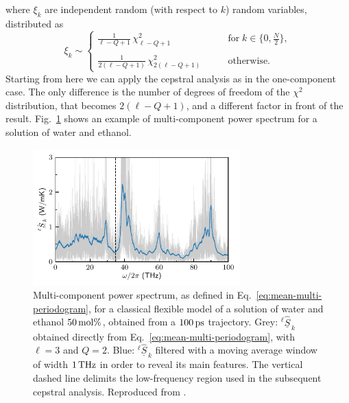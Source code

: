 where $\xi_k$ are independent random (with respect to $k$) random variables, distributed as
\begin{equation}
  \xi_k \sim
  \begin{cases}
    \frac{1}{\ell-Q+1} \,\chi^2_{\ell-Q+1}  \qquad & \mathrm{for} \; k \in \{0 , \frac{N}{2}\}, \\
 \\
 \frac{1}{2(\ell-Q+1)} \, \chi^2_{2(\ell-Q+1)} \qquad & \mathrm{otherwise}.
\end{cases}
\end{equation}
Starting from here we can apply the cepstral analysis as in the one-component case. The only difference is the number of degrees of freedom of the $\chi^2$ distribution, that becomes $2(\ell -Q+1)$, and a different factor in front of the result. Fig.~\ref{fig:grappa-periodogram} shows an example of multi-component power spectrum for a solution of water and ethanol.

\begin{figure}
\centering
\includegraphics[width=8cm]{chapters/chapter5/figures/psd_water_ethanol_40.pdf}
\caption{Multi-component power spectrum, as defined in Eq.~\eqref{eq:mean-multi-periodogram}, for a classical flexible model of a solution of water and ethanol $50\,\mathrm{mol}\%$, obtained from a $100\,\mathrm{ps}$ trajectory. Grey: $^{\ell}\hat{\underline{S}}_{\,k}$ obtained directly from Eq.~\eqref{eq:mean-multi-periodogram}, with $\ell=3$ and $Q=2$. Blue: $^{\ell}\hat{\underline{S}}_{\,k}$ filtered with a moving average window of width $1\,\mathrm{THz}$ in order to reveal its main features. The vertical dashed line delimits the low-frequency region used in the subsequent cepstral analysis. Reproduced from \cite{Bertossa2018}.}  \label{fig:grappa-periodogram}
\end{figure}

